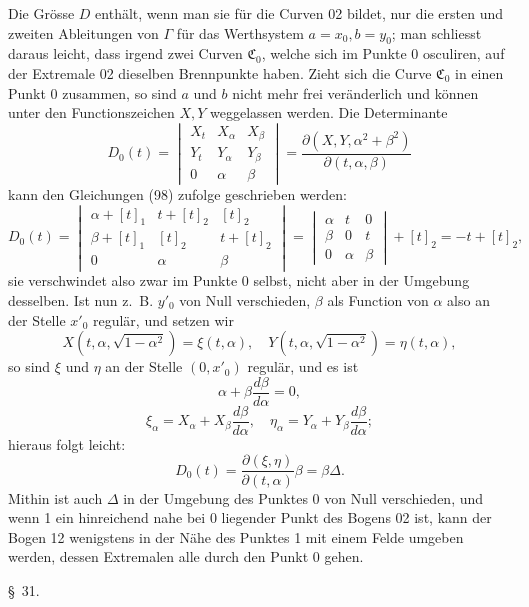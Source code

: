 \documentclass[11pt,a4paper,leqno]{article}
\begin{document}
Die Grösse $D$ enthält, wenn man sie für die Curven 02 bildet, nur die ersten und zweiten Ableitungen von $\Gamma$ für das Werthsystem $a=x_0,b=y_0$; man schliesst daraus leicht, dass irgend zwei Curven $\mathfrak C_0$, welche sich im Punkte 0 osculiren, auf der Extremale 02 dieselben Brennpunkte haben. Zieht sich die Curve $\mathfrak C_0$ in einen Punkt 0 zusammen, so sind $a$ und $b$ nicht mehr frei veränderlich und können unter den Functionszeichen $X,Y$ weggelassen werden. Die Determinante
\[
D_0(t)=
\begin{vmatrix}
X_t&X_{\alpha}&X_{\beta}\\
Y_t&Y_{\alpha}&Y_{\beta}\\
0&\alpha&\beta
\end{vmatrix}
=\frac{\partial(X,Y,\alpha^2+\beta^2)}{\partial(t,\alpha,\beta)}
\]
kann den Gleichungen (98) zufolge geschrieben werden:
\[
D_0(t)=
\begin{vmatrix}
\alpha+[t]_1&t+[t]_2&[t]_2\\
\beta+[t]_1&[t]_2&t+[t]_2\\
0&\alpha&\beta
\end{vmatrix}
=\begin{vmatrix}
\alpha&t&0\\
\beta&0&t\\
0&\alpha&\beta
\end{vmatrix}+[t]_2=-t+[t]_2,
\]
sie verschwindet also zwar im Punkte 0 selbst, nicht aber in der Umgebung desselben. Ist nun z.~B. $y'_0$ von Null verschieden, $\beta$ als Function von $\alpha$ also an der Stelle $x'_0$ regulär, und setzen wir
\[
X(t,\alpha,\sqrt{1-\alpha^2})=\xi(t,\alpha),
\quad
Y(t,\alpha,\sqrt{1-\alpha^2})=\eta(t,\alpha),
\]
so sind $\xi$ und $\eta$ an der Stelle $(0,x'_0)$ regulär, und es ist
\[
\alpha+\beta\frac{d\beta}{d\alpha}=0,
\]
\[
\xi_{\alpha}=X_{\alpha}+X_{\beta}\frac{d\beta}{d\alpha},
\quad
\eta_{\alpha}=Y_{\alpha}+Y_{\beta}\frac{d\beta}{d\alpha};
\]
hieraus folgt leicht:
\[
D_0(t)=\frac{\partial(\xi,\eta)}{\partial(t,\alpha)}\beta=\beta\Delta.
\]
Mithin ist auch $\Delta$ in der Umgebung des Punktes 0 von Null verschieden, und wenn 1 ein hinreichend nahe bei 0 liegender Punkt des Bogens 02 ist, kann der Bogen 12 wenigstens in der Nähe des Punktes 1 mit einem Felde umgeben werden, dessen Extremalen alle durch den Punkt 0 gehen.

\begin{center}{\large \S~31.}\end{center}
\end{document}
